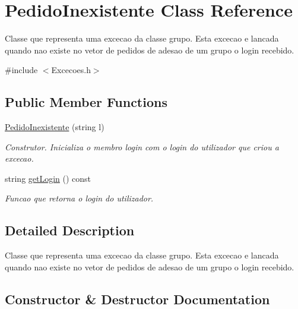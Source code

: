 \hypertarget{class_pedido_inexistente}{}\section{Pedido\+Inexistente Class Reference}
\label{class_pedido_inexistente}


Classe que representa uma excecao da classe grupo. Esta excecao e lancada quando nao existe no vetor de pedidos de adesao de um grupo o login recebido.  




{\ttfamily \#include $<$Excecoes.\+h$>$}

\subsection*{Public Member Functions}
\begin{DoxyCompactItemize}
\item 
\hyperlink{class_pedido_inexistente_ae30b81fc0eff41039f0efd87b055daca}{Pedido\+Inexistente} (string l)
\begin{DoxyCompactList}\small\item\em Construtor. Inicializa o membro login com o login do utilizador que criou a excecao. \end{DoxyCompactList}\item 
string \hyperlink{class_pedido_inexistente_a4922d9813deb3df3880405abef24cc74}{get\+Login} () const 
\begin{DoxyCompactList}\small\item\em Funcao que retorna o login do utilizador. \end{DoxyCompactList}\end{DoxyCompactItemize}


\subsection{Detailed Description}
Classe que representa uma excecao da classe grupo. Esta excecao e lancada quando nao existe no vetor de pedidos de adesao de um grupo o login recebido. 

\subsection{Constructor \& Destructor Documentation}
\hypertarget{class_pedido_inexistente_ae30b81fc0eff41039f0efd87b055daca}{}
